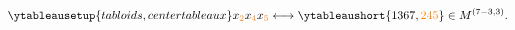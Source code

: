 \documentclass[equation,convert={outext=.svg,command=\unexpanded{pdf2svg \infile\space\outfile}},multi=false, varwidth=true, border={0 0 3cm 0}]{standalone}
\begin{document}
\begin{center}
\color{white}
\Huge
\boldmath
\begin{equation*}
  \ytableausetup{tabloids, centertableaux}
x_{\color{orange}2}x_{\color{orange}4}x_{\color{orange}5} \longleftrightarrow \ytableaushort{1367, {\color{orange}2}{\color{orange}4}{\color{orange}5}} \in M^{(7-3,3)}.
\end{equation*}
\end{center}
\end{document}
